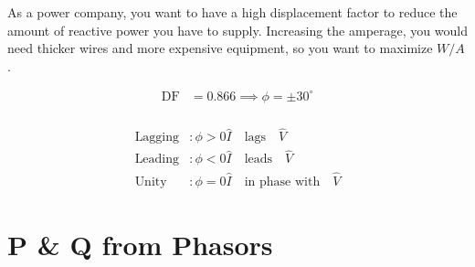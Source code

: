 \begin{remark}
    As a power company, you want to have a high displacement factor to reduce the amount of reactive power you have to supply. Increasing the amperage, you would need thicker wires and more expensive equipment, so you want to maximize $W/A$.
\end{remark}

\begin{example}
    \begin{align}
        \text{DF} & = 0.866 \implies \phi = \pm 30^{\circ} \\
    \end{align}
\end{example}
\begin{vocabulary}
    \begin{align}
        \text{Lagging} & : \phi > 0 \hat{I} \quad \text{lags}\quad  \hat{V}          \\
        \text{Leading} & : \phi < 0 \hat{I} \quad \text{leads}\quad  \hat{V}         \\
        \text{Unity}   & : \phi = 0 \hat{I} \quad \text{in phase with}\quad  \hat{V}
    \end{align}
\end{vocabulary}

\begin{figure}
    \centering
\end{figure}

\section{P \& Q from Phasors}

